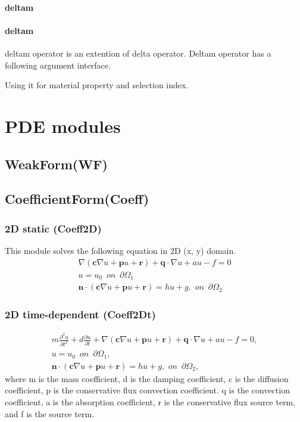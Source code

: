 \documentclass[11pt,a4paper,draft]{report}
\begin{document}
\subsubsection{deltam}
\subsubsection{deltam}
deltam operator is an extention of delta operator. Deltam operator has a following argument interface.


Using it for material property and selection index.

\chapter{PDE modules}
\section{WeakForm(WF)}
\section{CoefficientForm(Coeff)}
\subsection{2D static (Coeff2D)}
This module solves the following equation in 2D (x, y) domain.
  \begin{align}
   \nabla (\mathbf{c} \nabla u + \mathbf{p}u + \mathbf{r}) + \mathbf{q} \cdot \nabla u + au - f = 0 
  \\  
  u = u_{0} \,\,\,on\,\,\,\partial \Omega_{1}
  \\
 \mathbf{n}\cdot (\mathbf{c} \nabla u + \mathbf{p}u + \mathbf{r}) = hu + g,\,\,on\,\,\,\partial \Omega_{2}
  \end{align}
  
 

 
  \subsection{2D time-dependent (Coeff2Dt)}
  \begin{align}
  m\frac{\partial^2 u}{\partial t^2} +   d\frac{\partial u}{\partial t} + \nabla (\mathbf{c} \nabla u + \mathbf{p}u + \mathbf{r}) + \mathbf{q} \cdot \nabla u + au - f = 0, 
  \\  
  u = u_{0} \,\,\,on\,\,\,\partial \Omega_{1},
  \\
 \mathbf{n}\cdot (\mathbf{c} \nabla u + \mathbf{p}u + \mathbf{r}) = hu + g,\,\,on\,\,\,\partial \Omega_{2},
  \end{align}
where m is the mass coefficient, d is the damping coefficient, c is the diffusion coefficient, p is the conservative flux convection coefficient. q is the convection coefficient,  a is the absorption coefficient, r is the conservative flux source term, and f is the source term.
\end{document}
